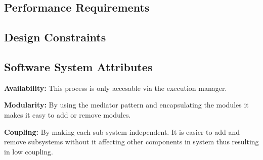\subsection{Performance Requirements}
\begin{itemize}
	
\end{itemize}
\subsection{Design Constraints}
\begin{enumerate}
	
\end{enumerate}
\subsection{Software System Attributes}
{ 
    \begin{flushleft}
    \par\textbf{Availability: }This process is only accesable via the execution manager.\newline
    
    \par\textbf{Modularity: }By using the mediator pattern and encapsulating the modules it makes it easy to add or remove modules.\newline
  
    \par\textbf{Coupling: }By making each sub-system independent. It is easier to add and remove subsystems without it affecting other components in system thus resulting in low coupling. \newline
    \end{flushleft}
    
}


